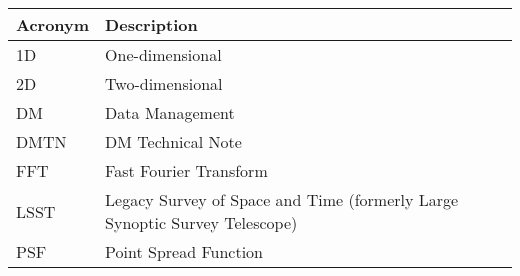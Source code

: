 \addtocounter{table}{-1}
\begin{longtable}{p{}p{}}\hline
\textbf{Acronym} & \textbf{Description}  \\\hline

1D & One-dimensional \\\hline
2D & Two-dimensional \\\hline
DM & Data Management \\\hline
DMTN & DM Technical Note \\\hline
FFT & Fast Fourier Transform \\\hline
LSST & Legacy Survey of Space and Time (formerly Large Synoptic Survey Telescope) \\\hline
PSF & Point Spread Function \\\hline
\end{longtable}
